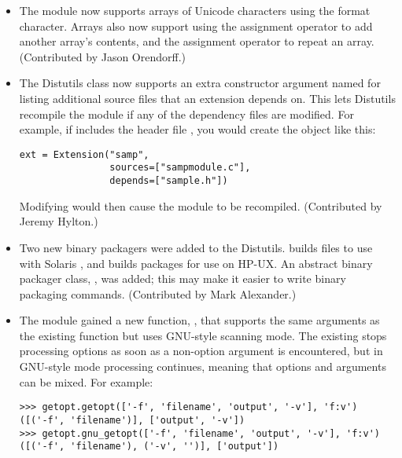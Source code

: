 \documentclass{howto}
\begin{document}
\begin{itemize}

\item The  module now supports arrays of Unicode
characters using the  format character.  Arrays also now
support using the \code{+=} assignment operator to add another array's
contents, and the \code{*=} assignment operator to repeat an array.
(Contributed by Jason Orendorff.)

\item The Distutils  class now supports 
an extra constructor argument named  for listing
additional source files that an extension depends on.  This lets
Distutils recompile the module if any of the dependency files are
modified.  For example, if  includes the header
file , you would create the  object like
this:

\begin{verbatim}
ext = Extension("samp",
                sources=["sampmodule.c"],
                depends=["sample.h"])
\end{verbatim}

Modifying  would then cause the module to be recompiled.
(Contributed by Jeremy Hylton.)

\item Two new binary packagers were added to the Distutils.
 builds  files to use with Solaris
, and  builds 
packages for use on HP-UX.  
An abstract binary packager class, 
, was added; this may make it
easier to write binary packaging commands.  (Contributed by Mark
Alexander.)

\item The  module gained a new function,
, that supports the same arguments as the existing
 function but uses GNU-style scanning mode. 
The existing  stops processing options as soon as a
non-option argument is encountered, but in GNU-style mode processing
continues, meaning that options and arguments can be mixed.  For
example:

\begin{verbatim}
>>> getopt.getopt(['-f', 'filename', 'output', '-v'], 'f:v')
([('-f', 'filename')], ['output', '-v'])
>>> getopt.gnu_getopt(['-f', 'filename', 'output', '-v'], 'f:v')
([('-f', 'filename'), ('-v', '')], ['output'])
\end{verbatim}


\end{itemize}
\end{document}
